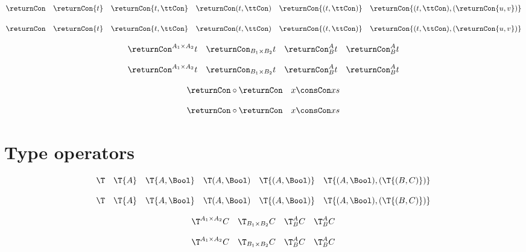 \documentclass{article}
\begin{document}
\begin{verbatim*}
\def\constructorfont{\mathsf}

\DeclareConstructorInfix{\consCon}{\dblcolon}
\end{verbatim*}

\begin{verbatim*}
\[
\returnCon\quad
\returnCon{t}\quad
\returnCon{t,\ttCon}\quad
\returnCon(t,\ttCon)\quad
\returnCon{{(t,\ttCon)}}\quad
\returnCon{(t,\ttCon),(\returnCon{u,v})}
\]
\end{verbatim*}
%
\[
  \returnCon               \quad
  \returnCon{t}            \quad
  \returnCon{t,\ttCon}     \quad
  \returnCon(t,\ttCon)     \quad
  \returnCon{{(t,\ttCon)}} \quad
  \returnCon{(t,\ttCon),(\returnCon{u,v})}
\]

\begin{verbatim*}
\[
\returnCon^{A_1\times A_2}{t}\quad
\returnCon_{B_1\times B_2}{t}\quad
\returnCon^A_B{t}\quad
\returnCon_B^A{t}
\]
\end{verbatim*}
%
\[
  \returnCon^{A_1 \times A_2}{t} \quad
  \returnCon_{B_1 \times B_2}{t} \quad
  \returnCon^A_B{t}              \quad
  \returnCon_B^A{t}
\]

\begin{verbatim*}
\[
\returnCon \circ \returnCon\quad
x \consCon xs
\]
\end{verbatim*}
%
\[
  \returnCon \circ \returnCon\quad
  x \consCon xs
\]

\section{Type operators}

\begin{verbatim*}
\def\typefont{\mathsf}

\DeclareTypeInfix{\Sum}{+}
\end{verbatim*}

\begin{verbatim*}
\[
\T\quad
\T{A}\quad
\T{A,\Bool}\quad
\T(A,\Bool)\quad
\T{{(A,\Bool)}}\quad
\T{{(A,\Bool)},(\T{(B,C)})}
\]
\end{verbatim*}
%
\[
  \T              \quad
  \T{A}           \quad
  \T{A,\Bool}     \quad
  \T(A,\Bool)     \quad
  \T{{(A,\Bool)}} \quad
  \T{{(A,\Bool)},(\T{(B,C)})}
\]

\begin{verbatim*}
\[
\T^{A_1\times A_2}{C}\quad
\T_{B_1\times B_2}{C}\quad
\T^A_B{C}\quad
\T_B^A{C}
\]
\end{verbatim*}
%
\[
  \T^{A_1 \times A_2}{C} \quad
  \T_{B_1 \times B_2}{C} \quad
  \T^A_B{C}              \quad
  \T_B^A{C}
\]
\end{document}
